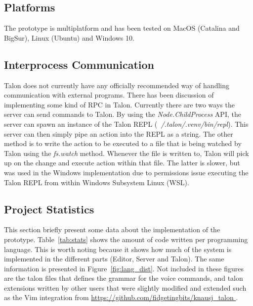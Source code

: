 \documentclass[../thesis.tex]{subfiles}
\begin{document}
\subsection{Platforms}
The prototype is multiplatform and has been tested on MacOS (Catalina and BigSur), Linux (Ubuntu) and Windows 10.

\subsection{Interprocess Communication}
Talon does not currently have any officially recommended way of handling communication with external programs.
There has been discussion of implementing some kind of RPC in Talon.
Currently there are two ways the server can send commands to Talon.
By using the \textit{Node.ChildProcess} API, the server can spawn an instance of the Talon REPL (\textit{~/.talon/.venv/bin/repl}).
This server can then simply pipe an action into the REPL as a string.
The other method is to write the action to be executed to a file that is being watched by Talon using the \textit{fs.watch}
method. Whenever the file is written to, Talon will pick up on the change and execute action within that file.
The latter is slower, but was used in the Windows implementation due to permissions issue executing the Talon REPL from within Windows Subsystem Linux (WSL).



\subsection{Project Statistics}%
\label{sub:project_statistics}
This section briefly present some data about the implementation of the prototype.
Table~\ref{tab:stats} shows the amount of code written per programming language.
This is worth noting because it shows how much of the system is implemented in the different parts
(Editor, Server and Talon).
The same information is presented in Figure~\ref{fig:lang_dist}.
Not included in these figures are the talon files that defines the grammar for the voice commands,
and talon extensions written by other users that were slightly modified and extended such as the Vim integration from \url{https://github.com/fidgetingbits/knausj_talon
}.

%   
\end{document}
